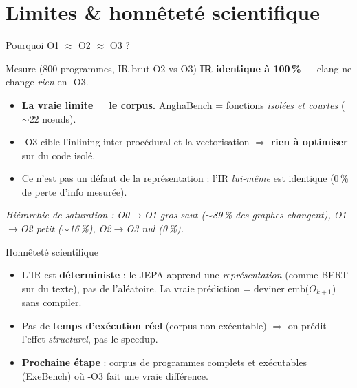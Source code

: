 \documentclass[aspectratio=169,11pt]{beamer}
\newcommand{\hl}[1]{\textcolor{jblue}{\textbf{#1}}}
\begin{document}
\section{Limites \& honnêteté scientifique}
\begin{frame}{Pourquoi O1 $\approx$ O2 $\approx$ O3 ?}
  \begin{block}{Mesure (800 programmes, IR brut O2 vs O3)}
    \centering \hl{IR identique à 100\,\%} — clang ne change \emph{rien} en -O3.
  \end{block}
  \begin{itemize}
    \item \textbf{La vraie limite = le corpus.} AnghaBench = fonctions
          \emph{isolées et courtes} ($\sim$22 nœuds).
    \item -O3 cible l'inlining inter-procédural et la vectorisation
          $\Rightarrow$ \hl{rien à optimiser} sur du code isolé.
    \item Ce n'est pas un défaut de la représentation : l'IR \emph{lui-même}
          est identique (0\,\% de perte d'info mesurée).
  \end{itemize}
  \vspace{1mm}
  \footnotesize\textit{Hiérarchie de saturation : O0$\to$O1 gros saut ($\sim$89\,\% des graphes changent),
  O1$\to$O2 petit ($\sim$16\,\%), O2$\to$O3 nul (0\,\%).}
\end{frame}

\begin{frame}{Honnêteté scientifique}
  \begin{itemize}
    \item L'IR est \textbf{déterministe} : le JEPA apprend une \emph{représentation}
          (comme BERT sur du texte), pas de l'aléatoire. La vraie prédiction =
          deviner emb($O_{k+1}$) sans compiler.
    \item Pas de \textbf{temps d'exécution réel} (corpus non exécutable)
          $\Rightarrow$ on prédit l'effet \emph{structurel}, pas le speedup.
    \item \hl{Prochaine étape} : corpus de programmes complets et exécutables
          (ExeBench) où -O3 fait une vraie différence.
  \end{itemize}
\end{frame}

\end{document}
